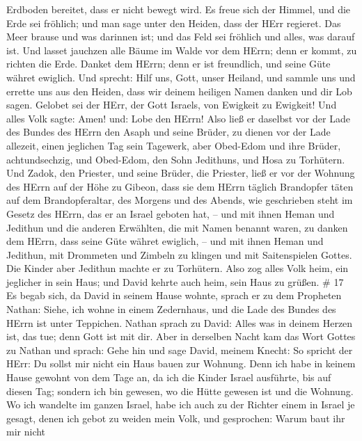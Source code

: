 Erdboden bereitet, dass er nicht bewegt wird.  Es freue
sich der Himmel, und die Erde sei fröhlich; und man sage unter den
Heiden, dass der HErr regieret.  Das Meer brause und was
darinnen ist; und das Feld sei fröhlich und alles, was darauf ist.
 Und lasset jauchzen alle Bäume im Walde vor dem HErrn;
denn er kommt, zu richten die Erde.  Danket dem HErrn; denn
er ist freundlich, und seine Güte währet ewiglich.  Und
sprecht: Hilf uns, Gott, unser Heiland, und sammle uns und errette uns
aus den Heiden, dass wir deinem heiligen Namen danken und dir Lob sagen.
 Gelobet sei der HErr, der Gott Israels, von Ewigkeit zu
Ewigkeit! Und alles Volk sagte: Amen! und: Lobe den HErrn! 
Also ließ er daselbst vor der Lade des Bundes des HErrn den Asaph und
seine Brüder, zu dienen vor der Lade allezeit, einen jeglichen Tag sein
Tagewerk,  aber Obed-Edom und ihre Brüder, achtundsechzig,
und Obed-Edom, den Sohn Jedithuns, und Hosa zu Torhütern. 
Und Zadok, den Priester, und seine Brüder, die Priester, ließ er vor der
Wohnung des HErrn auf der Höhe zu Gibeon,  dass sie dem
HErrn täglich Brandopfer täten auf dem Brandopferaltar, des Morgens und
des Abends, wie geschrieben steht im Gesetz des HErrn, das er an Israel
geboten hat, --  und mit ihnen Heman und Jedithun und die
anderen Erwählten, die mit Namen benannt waren, zu danken dem HErrn,
dass seine Güte währet ewiglich, --  und mit ihnen Heman
und Jedithun, mit Drommeten und Zimbeln zu klingen und mit Saitenspielen
Gottes. Die Kinder aber Jedithun machte er zu Torhütern. 
Also zog alles Volk heim, ein jeglicher in sein Haus; und David kehrte
auch heim, sein Haus zu grüßen. \# 17  Es begab sich, da
David in seinem Hause wohnte, sprach er zu dem Propheten Nathan: Siehe,
ich wohne in einem Zedernhaus, und die Lade des Bundes des HErrn ist
unter Teppichen.  Nathan sprach zu David: Alles was in
deinem Herzen ist, das tue; denn Gott ist mit dir.  Aber in
derselben Nacht kam das Wort Gottes zu Nathan und sprach: 
Gehe hin und sage David, meinem Knecht: So spricht der HErr: Du sollst
mir nicht ein Haus bauen zur Wohnung.  Denn ich habe in
keinem Hause gewohnt von dem Tage an, da ich die Kinder Israel
ausführte, bis auf diesen Tag; sondern ich bin gewesen, wo die Hütte
gewesen ist und die Wohnung.  Wo ich wandelte im ganzen
Israel, habe ich auch zu der Richter einem in Israel je gesagt, denen
ich gebot zu weiden mein Volk, und gesprochen: Warum baut ihr mir nicht
